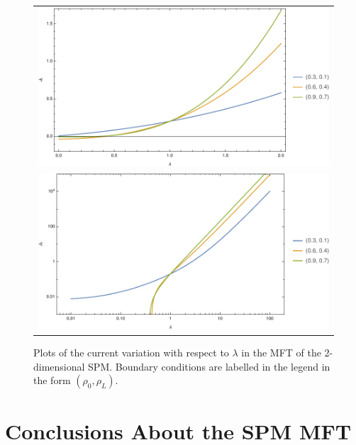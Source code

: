 \begin{figure}
\caption[$2$d SPM MFT current flow as a function of $\lambda$, with fixed boundaries.]{Plots of the current variation with respect to $\lambda$ in the MFT of the 2-dimensional SPM. Boundary conditions are labelled in the legend in the form $(\rho_0, \rho_L)$.} \label{fig:2dLambdaScans}
\begin{center}
 \begin{tabular}{c}
    \includegraphics[width=1.0\linewidth]{analytics/images/mftCurrent2d/current2d3BoundLin}  \\ \includegraphics[width=1.0\linewidth]{analytics/images/mftCurrent2d/current2d3BoundLog} \\
    \end{tabular}
\end{center}
    \vspace{-2em}
\end{figure}

\section{Conclusions About the SPM MFT}

